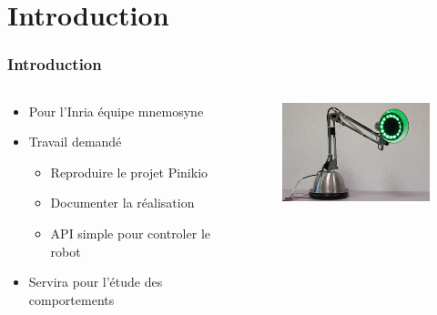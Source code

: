 \section{Introduction}
\begin{frame}
  \frametitle{Introduction}
  \begin{columns}[c]
    \begin{column}[T]{.5\textwidth}
      \begin{itemize}
        \item Pour l'Inria équipe mnemosyne
        \item Travail demandé
          \begin{itemize}
            \item Reproduire le projet Pinikio
            \item Documenter la réalisation
            \item API simple pour controler le robot
          \end{itemize}
        \item Servira pour l'étude des comportements
      \end{itemize}
    \end{column}
    \begin{column}[T]{.5\textwidth}
      \begin{figure}
        \begin{center}
          \includegraphics[width=5cm]{../img/pinokio.JPG}
        \end{center}
      \end{figure}
    \end{column}
  \end{columns}   
\end{frame}
